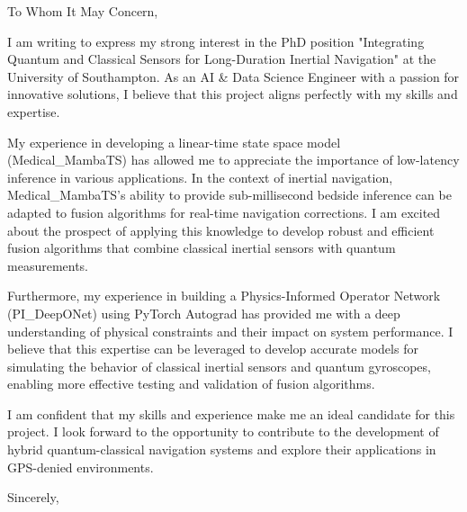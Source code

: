 \documentclass{letter}
\begin{document}
\opening{\noindent To Whom It May Concern,}

I am writing to express my strong interest in the PhD position "Integrating Quantum and Classical Sensors for Long-Duration Inertial Navigation" at the University of Southampton. As an AI & Data Science Engineer with a passion for innovative solutions, I believe that this project aligns perfectly with my skills and expertise.

My experience in developing a linear-time state space model (Medical_MambaTS) has allowed me to appreciate the importance of low-latency inference in various applications. In the context of inertial navigation, Medical_MambaTS's ability to provide sub-millisecond bedside inference can be adapted to fusion algorithms for real-time navigation corrections. I am excited about the prospect of applying this knowledge to develop robust and efficient fusion algorithms that combine classical inertial sensors with quantum measurements.

Furthermore, my experience in building a Physics-Informed Operator Network (PI_DeepONet) using PyTorch Autograd has provided me with a deep understanding of physical constraints and their impact on system performance. I believe that this expertise can be leveraged to develop accurate models for simulating the behavior of classical inertial sensors and quantum gyroscopes, enabling more effective testing and validation of fusion algorithms.

I am confident that my skills and experience make me an ideal candidate for this project. I look forward to the opportunity to contribute to the development of hybrid quantum-classical navigation systems and explore their applications in GPS-denied environments.

\closing{\noindent Sincerely,}
\end{document}
